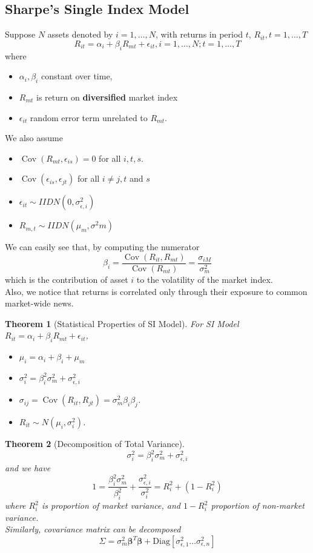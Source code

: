 \documentclass[12pt]{article}
\newtheorem{theorem}{Theorem}[section]
\theoremstyle{definition}
\DeclareMathOperator{\cov}{Cov}
\begin{document}
\subsection{Sharpe's Single Index Model}
Suppose $N$ assets denoted by $i = 1,\ldots, N$, with returns in period $t$, $R_{it}, t = 1,\ldots, T$
\[
R_{it} = \alpha_i + \beta_iR_{mt} + \epsilon_{it}, i = 1,\ldots, N; t=1,\ldots, T
\]
where
\begin{itemize}
\item $\alpha_i,\beta_i$ constant over time,
\item $R_{mt}$ is return on \textbf{diversified} market index
\item $\epsilon_{it}$ random error term unrelated to $R_{mt}$.
\end{itemize}
We also assume
\begin{itemize}
  \item $\cov(R_{mt}, \epsilon_{is}) = 0$ for all $i, t, s$.
  \item $\cov(\epsilon_{is}, \epsilon_{jt})$ for all $i\neq j, t$ and $s$
  \item $\epsilon_{it}\sim IID N(0, \sigma_{\epsilon, i}^2)$
  \item $R_{m,t}\sim IID N(\mu_m, \sigma^2 m)$
\end{itemize}
We can easily see that, by computing the numerator
\[
\beta_i = \frac{\cov(R_{it}, R_{mt})}{\cov(R_{mt})} = \frac{\sigma_{iM}}{\sigma_m^2}
\]
which is the contribution of asset $i$ to the volatility of the market index.\\
Also, we notice that returns is correlated only through their exposure to common market-wide news.\\
\begin{theorem}[Statistical Properties of SI Model]
For SI Model $R_{it} = \alpha_i + \beta_i R_{mt} + \epsilon_{it}$,
\begin{itemize}
  \item $\mu_i = \alpha_i + \beta_i + \mu_m$
  \item $\sigma_i^2 = \beta_i^2\sigma_m^2 + \sigma_{\epsilon, i}^2$
  \item $\sigma_{ij} = \cov(R_{it}, R_{jt}) = \sigma_m^2\beta_i\beta_j$.
  \item $R_{it}\sim N(\mu_i, \sigma_i^2)$.
\end{itemize}
\end{theorem}
\begin{theorem}[Decomposition of Total Variance]
\[
\sigma_i^2 = \beta_i^2\sigma_m^2 + \sigma_{\epsilon, i}^2
\]
and we have
\[
1 = \frac{\beta_i^2\sigma_m^2}{\beta_i^2} + \frac{ \sigma_{\epsilon, i}^2}{\sigma_i^2} = R_i^2 + (1 - R_i^2)
\]
where $R_i^2$ is proportion of market variance, and $1-R_i^2$ proportion of non-market variance.\\
Similarly, covariance matrix can be decomposed
\[
\Sigma = \sigma_m^2\mathbf{\beta}^T\mathbf{\beta} + \text{Diag}[\sigma_{\epsilon, 1}^2 \ldots \sigma_{\epsilon, n}^2]
\]
\end{theorem}
\end{document}
